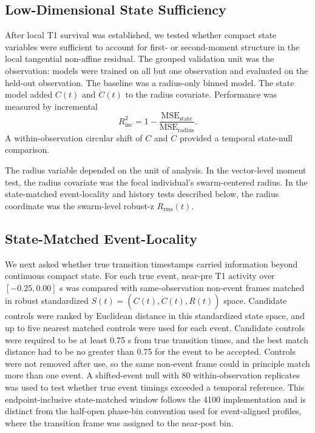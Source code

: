 \subsection{Low-Dimensional State Sufficiency}

After local T1 survival was established, we tested whether compact state
variables were sufficient to account for first- or second-moment structure in
the local tangential non-affine residual. The grouped validation unit was the
observation: models were trained on all but one observation and evaluated on
the held-out observation. The baseline was a radius-only binned model. The
state model added $C(t)$ and $\dot{C}(t)$ to the radius covariate. Performance
was measured by incremental
\begin{equation}
R^2_{\mathrm{inc}}
=
1-
\frac{\mathrm{MSE}_{\mathrm{state}}}{\mathrm{MSE}_{\mathrm{radius}}}.
\end{equation}
A within-observation circular shift of $C$ and $\dot{C}$ provided a temporal
state-null comparison.

The radius variable depended on the unit of analysis. In the vector-level
moment test, the radius covariate was the focal individual's swarm-centered
radius. In the state-matched event-locality and history tests described below,
the radius coordinate was the swarm-level robust-z $R_{\mathrm{rms}}(t)$.

\subsection{State-Matched Event-Locality}

We next asked whether true transition timestamps carried information beyond
continuous compact state. For each true event, near-pre T1 activity over
$[-0.25,0.00]$ s was compared with same-observation non-event frames matched
in robust standardized $S(t)=(C(t),\dot{C}(t),R(t))$ space. Candidate controls were ranked
by Euclidean distance in this standardized state space, and up to five nearest
matched controls were used for each event. Candidate controls were required to
be at least 0.75 s from true transition times, and the best match distance had
to be no greater than 0.75 for the event to be accepted. Controls were not
removed after use, so the same non-event frame could in principle match more
than one event. A shifted-event null with 80 within-observation replicates was
used to test whether true event timings exceeded a temporal reference.
This endpoint-inclusive state-matched window follows the 4100 implementation
and is distinct from the half-open phase-bin convention used for event-aligned
profiles, where the transition frame was assigned to the near-post bin.

